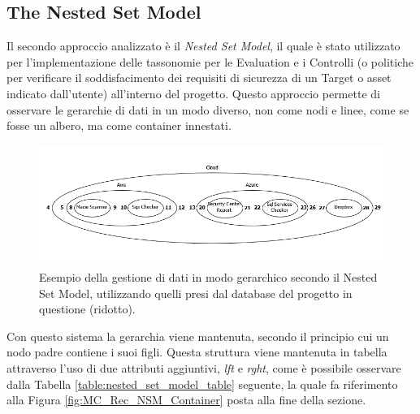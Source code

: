 \subsection{The Nested Set Model}
Il secondo approccio analizzato è il \textit{Nested Set Model}, il quale è stato utilizzato per l'implementazione delle tassonomie per le Evaluation e 
i Controlli (o politiche per verificare il soddisfacimento dei requisiti di sicurezza di un Target o asset indicato dall'utente) all'interno del progetto.\hfill\break
Questo approccio permette di osservare le gerarchie di dati in un modo diverso, non come nodi e linee, come se fosse un albero, ma come container innestati.
%
\begin{figure}[ht!]
    \includegraphics[scale=0.6]{images/MC_Rec_NSM_Container(R).png}
    \caption{Esempio della gestione di dati in modo gerarchico secondo il Nested Set Model, utilizzando quelli presi dal database del 
    progetto in questione (ridotto).}
    \label{fig:MC_Rec_NSM_Container_R}
\end{figure}
%
\hfill\break
%
Con questo sistema la gerarchia viene mantenuta, secondo il principio cui un nodo padre contiene i suoi figli. Questa struttura 
viene mantenuta in tabella attraverso l'uso di due attributi aggiuntivi, \textit{lft} e \textit{rght}, come è possibile osservare 
dalla Tabella \ref{table:nested_set_model_table} seguente, la quale fa riferimento alla Figura \ref{fig:MC_Rec_NSM_Container} 
posta alla fine della sezione.
